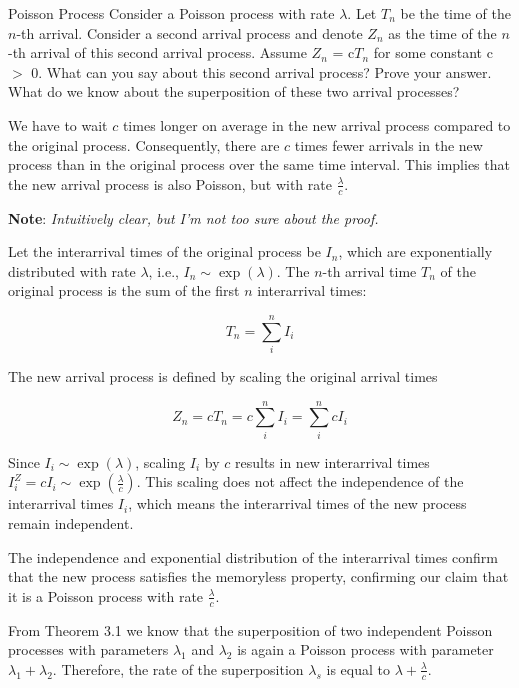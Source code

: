 \begin{problem}{Poisson Process}
Consider a Poisson process with rate $\lambda$. Let $T_n$ be the time of the $n$-th arrival. Consider a second arrival process and denote $Z_n$ as the time of the $n$-th arrival of this second arrival process. Assume $Z_n$ = c$T_n$ for some constant c $>$ 0. What can you say about this second arrival process? Prove your answer. What do we know about the superposition of these two arrival processes?
\end{problem}

\begin{solution}
    We have to wait $c$ times longer on average in the new arrival process compared to the original process. Consequently, there are $c$ times fewer arrivals in the new process than in the original process over the same time interval. This implies that the new arrival process is also Poisson, but with rate $\frac{\lambda}{c}$.
    \vspace{1em}


    \noindent\textbf{Note}: \textit{Intuitively clear, but I'm not too sure about the proof.}

    \vspace{1em}
    \noindent
    Let the interarrival times of the original process be $I_n$, which are exponentially distributed with rate $\lambda$, i.e., $I_n\sim \exp(\lambda)$. The $n$-th arrival time $T_n$ of the original process is the sum of the first $n$ interarrival times:

    \[
        T_n = \sum_i^nI_i
    \]

    The new arrival process is defined by scaling the original arrival times

    \[
        Z_n = cT_n = c\sum_i^nI_i = \sum_i^ncI_i
    \]

    Since $I_i\sim \exp(\lambda)$, scaling $I_i$ by $c$ results in new interarrival times $I^Z_i=cI_i\sim\exp(\frac{\lambda}{c})$. This scaling does not affect the independence of the interarrival times $I_i$, which means the interarrival times of the new process remain independent.

    The independence and exponential distribution of the interarrival times confirm that the new process satisfies the memoryless property, confirming our claim that it is a Poisson process with rate $\frac{\lambda}{c}$.

    From Theorem 3.1 we know that the superposition of two independent Poisson processes with parameters $\lambda_1$ and $\lambda_2$ is again a Poisson process with parameter $\lambda_1+\lambda_2$. Therefore, the rate of the superposition $\lambda_s$ is equal to $\lambda + \frac{\lambda}{c}$.
\end{solution}

